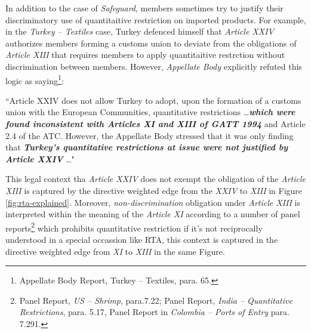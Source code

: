 In addition to the case of \textit{Safeguard}, 
members sometimes try to justify their discriminatory 
use of quantitaitive restriction on imported products. For example, in the \textit{Turkey – Textiles} case, Turkey defenced himself that \textit{Article XXIV} authorizes
members forming a customs union to deviate from the obligations of \textit{Article XIII} that requires members to apply quantitaitive restrction without discrimination between members. 
However, \textit{Appellate Body} explicitly refuted this logic as saying\footnote{Appellate Body Report, Turkey – Textiles, para. 65.}:
\begin{displayquote}[][]
    ``Article XXIV does not allow Turkey to adopt, upon the
    formation of a customs union with the European Communities, quantitative restrictions \ldots \textbf{\textit{which
    were found inconsistent with Articles XI and XIII of GATT 1994}} and Article 2.4 of the ATC.
    However, the Appellate Body stressed that it was only finding that \textbf{\textit{Turkey's quantitative
    restrictions at issue were not justified by Article XXIV}} \ldots"
\end{displayquote}
This legal context tha \textit{Article XXIV} does not exempt the obligation of the \textit{Article XIII} is captured by the directive weighted edge from the \textit{XXIV} to \textit{XIII} in Figure \ref{fig:rta-explained}.
Moreover, \textit{non-discrimination} obligation under \textit{Article XIII} is interpreted within the meaning of the \textit{Article XI} according to a number of panel reports\footnote{Panel Report, \textit{US – Shrimp}, para.7.22;  Panel Report, \textit{India – Quantitative Restrictions}, para. 5.17, Panel Report in \textit{Colombia – Ports of Entry} para. 7.291.  } which prohibits quantitative restriction if it's not reciprocally understood in a special occassion like RTA,
this context is captured in the directive weighted edge from \textit{XI} to \textit{XIII} in the same Figure.  